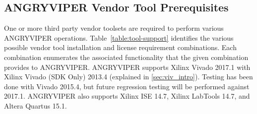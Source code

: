 \begin{flushleft}
\begin{landscape}
\section{ANGRYVIPER Vendor Tool Prerequisites}
\label{sec:doc_overview}
One or more third party vendor toolsets are required to perform various ANGRYVIPER operations. Table~\ref{table:tool-support} identifies the various possible vendor tool installation and license requirement combinations. Each combination enumerates the associated functionality that the given combination provides to ANGRYVIPER. ANGRYVIPER supports Xilinx Vivado 2017.1 with Xilinx Vivado (SDK Only) 2013.4 (explained in \ref{sec:viv_intro}). Testing has been done with Vivado 2015.4, but future regression testing will be performed against 2017.1. ANGRYVIPER also supports Xilinx ISE 14.7, Xilinx LabTools 14.7, and Altera Quartus 15.1.


\end{landscape}
\end{flushleft}
